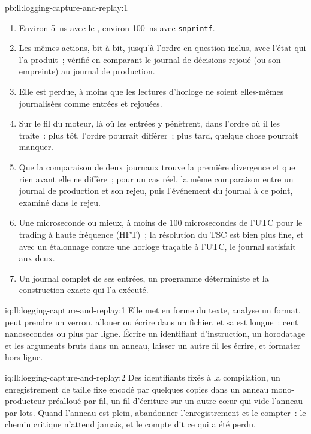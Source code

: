 \begin{solution}{pb:ll:logging-capture-and-replay:1}
\begin{enumerate}
\item Environ \qty{5}{\nano\second} avec le , environ \qty{100}{\nano\second} avec \texttt{snprintf}.
\item Les mêmes actions, bit à bit, jusqu'à l'ordre en question inclus, avec l'état qui l'a produit~; vérifié en
comparant le journal de décisions rejoué (ou son empreinte) au journal de production.
\item Elle est perdue, à moins que les lectures d'horloge ne soient elles-mêmes journalisées comme entrées et rejouées.
\item Sur le fil du moteur, là où les entrées y pénètrent, dans l'ordre où il les traite~: plus tôt, l'ordre pourrait
différer~; plus tard, quelque chose pourrait manquer.
\item Que la comparaison de deux journaux trouve la première divergence et que rien avant elle ne diffère~; pour un cas réel, la même
comparaison entre un journal de production et son rejeu, puis l'événement du journal à ce point, examiné dans le rejeu.
\item Une microseconde ou mieux, à moins de 100 microsecondes de l'UTC pour le trading à haute fréquence (HFT)~; la résolution du TSC est bien plus fine,
et avec un étalonnage contre une horloge traçable à l'UTC, le journal satisfait aux deux.
\item Un journal complet de ses entrées, un programme déterministe et la construction exacte qui l'a exécuté.
\end{enumerate}
\end{solution}

\begin{solution}{iq:ll:logging-capture-and-replay:1}
Elle met en forme du texte, analyse un format, peut prendre un verrou, allouer ou écrire dans un fichier, et sa
 est longue~: cent nanosecondes ou plus par ligne. Écrire un identifiant d'instruction, un horodatage et les arguments bruts dans un anneau, laisser un autre fil les écrire, et
formater hors ligne.
\end{solution}

\begin{solution}{iq:ll:logging-capture-and-replay:2}
Des identifiants fixés à la compilation, un enregistrement de taille fixe encodé par quelques copies dans un anneau mono-producteur préalloué par
fil, un fil d'écriture sur un autre cœur qui vide l'anneau par lots. Quand l'anneau est plein, abandonner l'enregistrement et le compter~: le chemin
critique n'attend jamais, et le compte dit ce qui a été perdu.
\end{solution}

